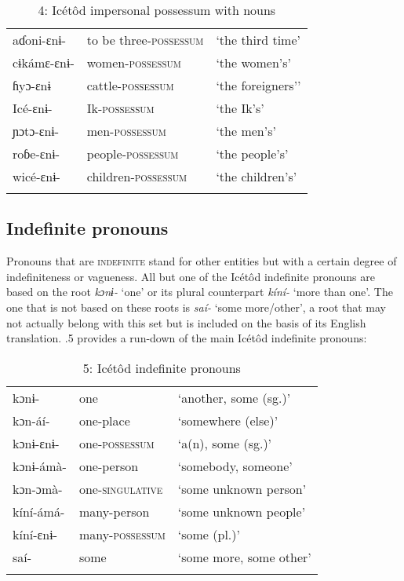 \begin{table}
\caption{4: Icétôd impersonal possessum with nouns}
\label{tab:5}


\begin{tabularx}{\textwidth}{XXX}
\lsptoprule

aɗoni-ɛnɨ- & to be three-\textsc{possessum} & ‘the third time’\\
cɨkámɛ-ɛnɨ- & women-\textsc{possessum} & ‘the women’s’\\
ɦyɔ-ɛnɨ & cattle-\textsc{possessum} & ‘the foreigners’’\\
Icé-ɛnɨ- & Ik-\textsc{possessum} & ‘the Ik’s’\\
ɲɔtɔ-ɛnɨ- & men-\textsc{possessum} & ‘the men’s’\\
roɓe-ɛnɨ- & people-\textsc{possessum} & ‘the people’s’\\
wicé-ɛnɨ- & children-\textsc{possessum} & ‘the children’s’\\
\lspbottomrule
\end{tabularx}
\end{table}



\subsection{Indefinite pronouns}


Pronouns that are \textsc{indefinite} stand for other entities but with a certain degree of indefiniteness or vagueness. All but one of the Icétôd indefinite pronouns are based on the root \textit{kɔnɨ- }‘one’ or its plural counterpart \textit{kíní- }‘more than one’. The one that is not based on these roots is \textit{saí- }‘some more/other’, a root that may not actually belong with this set but is included on the basis of its English translation. .5 provides a run-down of the main Icétôd indefinite pronouns:


\begin{table}
\caption{5: Icétôd indefinite pronouns}
\label{tab:5}


\begin{tabularx}{\textwidth}{XXX}
\lsptoprule

kɔnɨ- & one & ‘another, some (sg.)’\\
kɔn-áí- & one-place & ‘somewhere (else)’\\
kɔnɨ-ɛnɨ- & one-\textsc{possessum} & ‘a(n), some (sg.)’\\
kɔnɨ-ámà- & one-person & ‘somebody, someone’\\
kɔn-ɔmà- & one-\textsc{singulative} & ‘some unknown person’\\
kíní-ámá- & many-person & ‘some unknown people’\\
kíní-ɛnɨ- & many-\textsc{possessum} & ‘some (pl.)’\\
saí- & some & ‘some more, some other’\\
\lspbottomrule
\end{tabularx}
\end{table}



